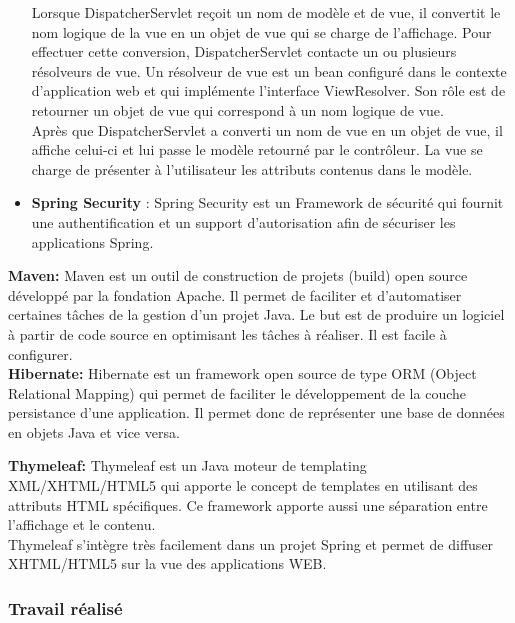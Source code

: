 \documentclass[12pt]{article}
\begin{document}
\begin{itemize}
Lorsque DispatcherServlet reçoit un nom de modèle et de vue, il convertit le nom logique de la vue en un objet de vue qui se charge de l’affichage. Pour effectuer cette conversion, DispatcherServlet contacte un ou plusieurs résolveurs de vue. Un résolveur de vue est un bean configuré dans le contexte d’application web et qui implémente
l’interface ViewResolver. Son rôle est de retourner un objet de vue qui correspond à un nom logique de vue.\\


Après que DispatcherServlet a converti un nom de vue en un objet de vue, il affiche celui-ci et lui passe le modèle retourné par le contrôleur. La vue se charge de présenter à l’utilisateur les attributs contenus dans le modèle.\\

	
	\item \textbf{Spring Security }: Spring Security est un Framework de sécurité  qui fournit une authentification et un support d’autorisation afin de sécuriser les applications Spring. \newline
\end{itemize} 

\textbf{Maven:} Maven est un outil de construction de projets (build) open source développé par la fondation Apache. Il permet de faciliter et d'automatiser certaines tâches de la gestion d'un projet Java. Le but est de produire un logiciel à partir de code source en optimisant les tâches à réaliser. Il est facile à configurer.\\

\textbf{Hibernate: } Hibernate est un framework open source de type ORM (Object Relational Mapping) qui permet de faciliter le développement de la couche persistance d'une application. Il permet donc de représenter une base de données en objets Java et vice versa.\newline


\textbf{Thymeleaf:} Thymeleaf est un Java moteur de templating XML/XHTML/HTML5 qui apporte le concept de templates en utilisant des attributs HTML spécifiques. Ce framework apporte aussi une séparation entre l'affichage et le contenu.\\

Thymeleaf s’intègre très facilement dans un projet Spring et permet de diffuser XHTML/HTML5 sur la vue des applications WEB.


\subsubsection{Travail réalisé}
\end{document}
